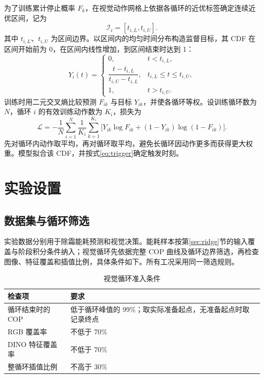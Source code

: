 \documentclass[UTF8,11pt,a4paper,fontset=fandol]{ctexart}
\begin{document}
为了训练累计停止概率 $F_k$，在视觉动作网格上依据各循环的近优标签确定连续近优区间，记为
\begin{equation}
\mathcal I_i=[t_{i,L},t_{i,U}].
\end{equation}
其中 $t_{i,L}$、$t_{i,U}$ 为区间边界。以区间内的均匀时间分布构造监督目标，其 CDF 在区间开始前为 0，在区间内线性增加，到区间结束时达到 1：
\begin{equation}
Y_i(t)=\begin{cases}
0,&t<t_{i,L},\\
\dfrac{t-t_{i,L}}{t_{i,U}-t_{i,L}},&t_{i,L}\leq t\leq t_{i,U},\\
1,&t>t_{i,U}.
\end{cases}
\label{eq:target}
\end{equation}
训练时用二元交叉熵比较预测 $F_{ik}$ 与目标 $Y_{ik}$，并使各循环等权。设训练循环数为 $N$，循环 $i$ 的有效训练动作数为 $K_i$，损失为
\begin{equation}
\mathcal L=-\frac1N\sum_{i=1}^N\frac1{K_i}\sum_{k=1}^{K_i}
\bigl[Y_{ik}\log F_{ik}+(1-Y_{ik})\log(1-F_{ik})\bigr].
\end{equation}
先对循环内动作取平均，再对循环取平均，避免长循环因动作更多而获得更大权重。模型拟合该 CDF，并按式\eqref{eq:trigger}确定触发时刻。

\section{实验设置}
\label{sec:experiments}
\subsection{数据集与循环筛选}
实验数据分别用于除霜能耗预测和视觉决策。能耗样本按第\ref{sec:ridge}节的输入覆盖与阶段积分条件纳入；视觉循环先依据完整 COP 曲线及循环边界筛选，再检查图像、特征覆盖和插值比例，具体条件如下。所有工况采用同一筛选规则。

\begin{table}[H]
\centering\caption{视觉循环准入条件}
\begin{tabularx}{\textwidth}{p{44mm}Y}
\toprule
检查项 & 要求 \\
\midrule
循环结束时的 COP & 低于循环峰值的 99\%；取实际准备起点，无准备起点时取记录终点 \\
RGB 覆盖率 & 不低于 70\% \\
DINO 特征覆盖率 & 不低于 70\% \\
整循环插值比例 & 不高于 30\% \\
\bottomrule
\end{tabularx}
\end{table}
\end{document}
